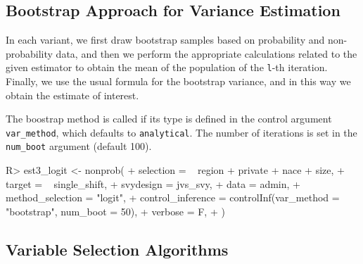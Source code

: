 \documentclass[
]{jss}
\begin{document}
\hypertarget{bootstrap-approach-for-variance-estimation}{%
\subsection{Bootstrap Approach for Variance
Estimation}\label{bootstrap-approach-for-variance-estimation}}

In each variant, we first draw bootstrap samples based on probability
and non-probability data, and then we perform the appropriate
calculations related to the given estimator to obtain the mean of the
population of the \texttt{l}-th iteration. Finally, we use the usual
formula for the bootstrap variance, and in this way we obtain the
estimate of interest.

The boostrap method is called if its type is defined in the control
argument \texttt{var\_method}, which defaults to \texttt{analytical}.
The number of iterations is set in the \texttt{num\_boot} argument
(default 100).

\begin{CodeChunk}
\begin{CodeInput}
R> est3_logit <- nonprob(
+   selection = ~ region + private + nace + size,
+   target = ~ single_shift,
+   svydesign = jvs_svy,
+   data = admin,
+   method_selection = "logit",
+   control_inference = controlInf(var_method = "bootstrap", num_boot = 50),
+   verbose = F,
+ )
\end{CodeInput}
\end{CodeChunk}

\hypertarget{variable-selection-algorithms}{%
\subsection{Variable Selection
Algorithms}\label{variable-selection-algorithms}}
\end{document}
